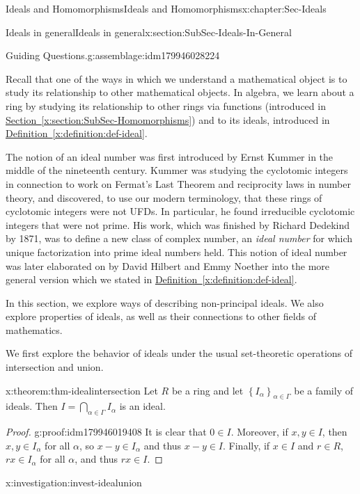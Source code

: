 \documentclass[oneside,10pt,]{book}
\newcommand{\xreffont}{\relax}
\numberwithin{equation}{section}
\newcommand{\set}[1]{\left\{ {#1} \right\}}
\begin{document}
\begin{chapterptx}{Ideals and Homomorphisms}{}{Ideals and Homomorphisms}{}{}{x:chapter:Sec-Ideals}
\begin{sectionptx}{Ideals in general}{}{Ideals in general}{}{}{x:section:SubSec-Ideals-In-General}
\begin{assemblage}{Guiding Questions.}{g:assemblage:idm179946028224}
\begin{itemize}[label=\textbullet]
\end{itemize}
%
\end{assemblage}
\begin{introduction}{}%
Recall that one of the ways in which we understand a mathematical object is to study its relationship to other mathematical objects. In algebra, we learn about a ring by studying its relationship to other rings via functions (introduced in \hyperref[x:section:SubSec-Homomorphisms]{Section~{\xreffont\ref{x:section:SubSec-Homomorphisms}}}) and to its ideals, introduced in \hyperref[x:definition:def-ideal]{Definition~{\xreffont\ref{x:definition:def-ideal}}}.%
\par
The notion of an ideal number was first introduced by Ernst Kummer in the middle of the nineteenth century. Kummer was studying the cyclotomic integers in connection to work on Fermat's Last Theorem and reciprocity laws in number theory, and discovered, to use our modern terminology, that these rings of cyclotomic integers were not UFDs. In particular, he found irreducible cyclotomic integers that were not prime. His work, which was finished by Richard Dedekind by 1871, was to define a new class of complex number, an \emph{ideal number} for which unique factorization into prime ideal numbers held. This notion of ideal number was later elaborated on by David Hilbert and Emmy Noether into the more general version which we stated in \hyperref[x:definition:def-ideal]{Definition~{\xreffont\ref{x:definition:def-ideal}}}.%
\par
In this section, we explore ways of describing non-principal ideals. We also explore properties of ideals, as well as their connections to other fields of mathematics.%
\end{introduction}%
We first explore the behavior of ideals under the usual set-theoretic operations of intersection and union.%
\begin{theorem}{}{}{x:theorem:thm-idealintersection}%
Let \(R\) be a ring and let \(\set{I_{\alpha}}_{\alpha\in \Gamma}\) be a family of ideals. Then \(I = \bigcap\limits_{\alpha\in \Gamma} I_\alpha\) is an ideal.%
\end{theorem}
\begin{proof}{}{g:proof:idm179946019408}
It is clear that \(0\in I\). Moreover, if \(x,y\in I\), then \(x,y\in I_\alpha\) for all \(\alpha\), so \(x-y\in I_\alpha\) and thus \(x-y\in I\). Finally, if \(x\in I\) and \(r\in R\), \(rx\in I_\alpha\) for all \(\alpha\), and thus \(rx\in I\).%
\end{proof}
\begin{investigation}{}{x:investigation:invest-idealunion}%

\end{investigation}
\end{sectionptx}
\end{chapterptx}
\end{document}

